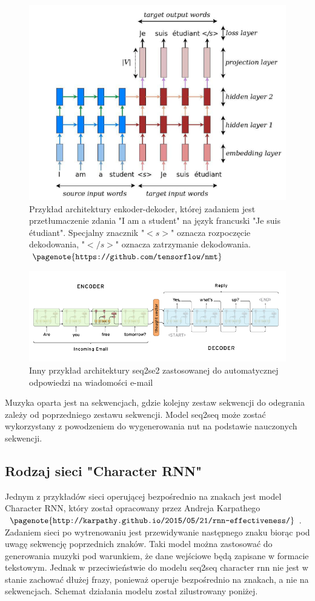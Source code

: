 	\begin{figure}[H]
		\centering
		\includegraphics[width=0.8\linewidth]{seq2seq3}
		\caption{Przykład architektury enkoder-dekoder, której zadaniem jest przetłumaczenie zdania "I am a student" na język francuski "Je suis étudiant". Specjalny znacznik "$<s>$" oznacza rozpoczęcie dekodowania, "$</s>$" oznacza zatrzymanie dekodowania. $\pagenote{\texttt{https://github.com/tensorflow/nmt}}$ }
		\label{fig:seq2seq3}
	\end{figure}
	\begin{figure}[H]
		\centering
		\includegraphics[width=0.8\linewidth]{seq2seq2}
		\caption{Inny przykład architektury seq2se2 zastosowanej do automatycznej odpowiedzi na wiadomości e-mail}
		\label{fig:seq2seq2}
	\end{figure}		
	Muzyka oparta jest na sekwencjach, gdzie kolejny zestaw sekwencji do odegrania zależy od poprzedniego zestawu sekwencji. Model seq2seq może zostać wykorzystany z powodzeniem do wygenerowania nut na podstawie nauczonych sekwencji.	
	\subsection{Rodzaj sieci "Character RNN"}
	Jednym z przykładów sieci operującej bezpośrednio na znakach jest model Character RNN, który został opracowany przez Andreja Karpathego$\pagenote{\texttt{http://karpathy.github.io/2015/05/21/rnn-effectiveness/}}$. Zadaniem sieci po wytrenowaniu jest przewidywanie następnego znaku biorąc pod uwagę sekwencję poprzednich znaków. Taki model można zastosować do generowania muzyki pod warunkiem, że dane wejściowe będą zapisane w formacie tekstowym. Jednak w przeciwieństwie do modelu seq2seq character rnn nie jest w stanie zachować dłużej frazy, ponieważ operuje bezpośrednio na znakach, a nie na sekwencjach. Schemat działania modelu został zilustrowany poniżej.
	
